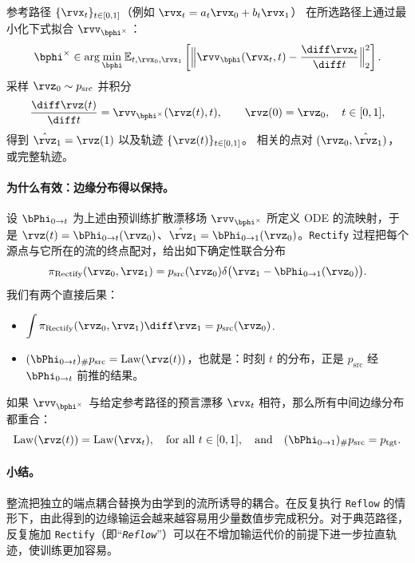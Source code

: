 \begin{algorithm}[H]
\caption{\texttt{Rectify} 操作\label{alg:Rectify}}
\begin{algorithmic}[1]
\Require 参考路径 $\{\rvx_t\}_{t\in[0,1]}$（例如 $\rvx_t=a_t\rvx_0+b_t\rvx_1$）
\State {} 在所选路径上通过最小化下式拟合 $\rvv_{\bphi^\times}$：
\[
\bphi^\times \in \arg\min_{\bphi}
\mathbb{E}_{t,\rvx_0,\rvx_1} \left[\Big\|\rvv_{\bphi}(\rvx_t,t)-\frac{\diff \rvx_t}{\diff t}\Big\|_2^2\right].
\]
\State {} 采样 $\rvz_0 \sim p_{\text{src}}$ 并积分
\[
\frac{\diff \rvz(t)}{\diff t}=\rvv_{\bphi^\times}(\rvz(t),t),\qquad \rvz(0)=\rvz_0,\quad t\in[0,1],
\]
得到 $\hat\rvz_1=\rvz(1)$ 以及轨迹 $\{\rvz(t)\}_{t\in[0,1]}$。
\Ensure 相关的点对 $(\rvz_0,\hat\rvz_1)$，或完整轨迹。
\end{algorithmic}
\end{algorithm}

\paragraph{为什么有效：边缘分布得以保持。}
设 $\bPhi_{0\to t}$ 为上述由预训练扩散漂移场 $\rvv_{\bphi^\times}$ 所定义 ODE 的流映射，于是 $\rvz(t)=\bPhi_{0\to t}(\rvz_0)$、$\hat\rvz_1=\bPhi_{0\to 1}(\rvz_0)$。\texttt{Rectify} 过程把每个源点与它所在的流的终点配对，给出如下确定性联合分布
\[
\pi_{\text{Rectify}}(\rvz_0,\rvz_1)
= p_{\text{src}}(\rvz_0) \delta \big(\rvz_1-\bPhi_{0\to 1}(\rvz_0)\big).
\]
我们有两个直接后果：
\begin{itemize}
    \item {}
    $\displaystyle \int \pi_{\text{Rectify}}(\rvz_0,\rvz_1) \diff \rvz_1
    = p_{\text{src}}(\rvz_0)$.
    \item {}
    $\displaystyle (\bPhi_{0\to t})_{\#}p_{\text{src}}=\mathrm{Law}(\rvz(t))$，也就是：时刻 $t$ 的分布，正是 $p_{\text{src}}$ 经 $\bPhi_{0\to t}$ 前推的结果。
\end{itemize}
如果 $\rvv_{\bphi^\times}$ 与给定参考路径的预言漂移 $\rvx_t$ 相符，那么所有中间边缘分布都重合：
\[
\mathrm{Law}(\rvz(t))=\mathrm{Law}(\rvx_t),\quad \text{for all }t\in[0,1],
\quad\text{and}\quad
(\bPhi_{0\to 1})_{\#}p_{\mathrm{src}}=p_{\mathrm{tgt}}.
\]


\paragraph{小结。}
整流把独立的端点耦合替换为由学到的流所诱导的耦合。在反复执行 \texttt{Reflow} 的情形下，由此得到的边缘输运会越来越容易用少量数值步完成积分。对于典范路径，反复施加 \texttt{Rectify}（即“\emph{\texttt{Reflow}}”）可以在不增加输运代价的前提下进一步拉直轨迹，使训练更加容易。


